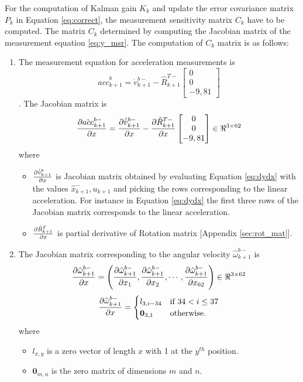 For the computation of Kalman gain $K_k$ and update the error covariance matrix $P_k$ in Equation \ref{eq:correct}, the measurement sensitivity matrix $C_k$ have to be computed. The matrix $C_k$ determined by computing the Jacobian matrix of the measurement equation \ref{eq:y_msr}. The computation of $C_k$ matrix is as follows:
\begin{enumerate}
\item The measurement equation for acceleration measurements is  $$\hat{acc}^b_{k+1} = \dot{v}^{b-}_{k+1}-\hat{R}_{k+1}^{T-}\begin{bmatrix} 0 \\ 0 \\ -9,81 \end{bmatrix}$$.
The Jacobian matrix is 
\begin{equation}
    \label{eq:dacc_msrdx}
    \frac{\partial {\hat{acc}_{k+1}^{b-}}}{\partial {x}} = \frac{\partial {\hat{\dot{v}}_{k+1}^{b-}}}{\partial {x}} - \frac{\partial {\hat{R}^{T-}_{k+1}}}{\partial {x}}\begin{bmatrix} 0 \\ 0 \\ -9,81 \end{bmatrix}  \in \Re^{3 \times 62}
\end{equation}where
\begin{itemize}
    \item $\frac{\partial {\hat{\dot{v}}_{k+1}^b}}{\partial {x}}$ is Jacobian matrix obtained by evaluating Equation \ref{eq:dydx} with the values $\hat x_{k+1}^-, u_{k+1}$ and picking the rows corresponding to the linear acceleration. For instance in Equation \ref{eq:dydx} the first three rows of the Jacobian matrix corresponds to the linear acceleration.
    \item $\frac{\partial {\hat{R}^T_{k+1}}}{\partial {x}}$ is partial derivative of Rotation matrix [Appendix \ref{sec:rot_mat}].
\end{itemize}

\item The Jacobian matrix corresponding to the angular velocity $\hat{\omega}^{b-}_{k+1}$ is 
\begin{equation}
    \label{eq:dw_msrdx} 
    \frac{\partial {\hat{\omega}^{b-}_{k+1}}}{\partial {x}} = \left(\frac{\partial {\hat{\omega}^{b-}_{k+1}}}{\partial {x_{1}}}, \frac{\partial {\hat{\omega}^{b-}_{k+1}}}{\partial {x_{2}}}, \cdots , \frac{\partial {\hat{\omega}^{b-}_{k+1}}}{\partial {x_{62}}}\right) \in \Re^{3 \times 62}
\end{equation}
\[ \frac{\partial {\hat{\omega}^{b-}_{k+1}}}{\partial {x}} = 
    \begin{cases}
    l_{3,i-34} & \text{if } 34 < i \leq 37 \\
    \textbf{0}_{3,1} &\text{otherwise}.
    \end{cases}
 \]where 
 \begin{itemize}  
 \item $l_{x,y}$ is a zero vector of length $x$ with 1 at the $y^{th}$ position.
 \item $\textbf{0}_{m,n}$ is the zero matrix of dimensions $m$ and $n$.
 \end{itemize}


\end{enumerate}
